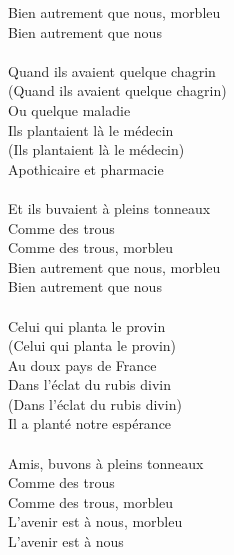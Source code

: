 Bien autrement que nous, morbleu\\
Bien autrement que nous\\\\
Quand ils avaient quelque chagrin\\
(Quand ils avaient quelque chagrin)\\
Ou quelque maladie\\
Ils plantaient là le médecin\\
(Ils plantaient là le médecin)\\
Apothicaire et pharmacie\\\\
Et ils buvaient à pleins tonneaux\\
Comme des trous\\
Comme des trous, morbleu\\
Bien autrement que nous, morbleu\\
Bien autrement que nous\\\\
Celui qui planta le provin\\
(Celui qui planta le provin)\\
Au doux pays de France\\
Dans l'éclat du rubis divin\\
(Dans l'éclat du rubis divin)\\
Il a planté notre espérance\\\\
Amis, buvons à pleins tonneaux\\
Comme des trous\\
Comme des trous, morbleu\\
L'avenir est à nous, morbleu\\
L'avenir est à nous\\
